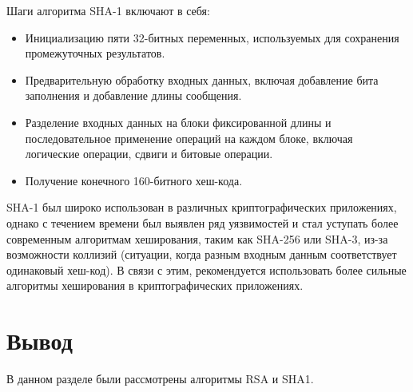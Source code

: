 Шаги алгоритма SHA-1 включают в себя:
\begin{itemize}
	\item Инициализацию пяти 32-битных переменных, используемых для сохранения промежуточных результатов.
	\item Предварительную обработку входных данных, включая добавление бита заполнения и добавление длины сообщения.
	\item Разделение входных данных на блоки фиксированной длины и последовательное применение операций на каждом блоке, включая логические операции, сдвиги и битовые операции.
	\item Получение конечного 160-битного хеш-кода.
\end{itemize}

SHA-1 был широко использован в различных криптографических приложениях, однако с течением времени был выявлен ряд уязвимостей и стал уступать более современным алгоритмам хеширования, таким как SHA-256 или SHA-3, из-за возможности коллизий (ситуации, когда разным входным данным соответствует одинаковый хеш-код). В связи с этим, рекомендуется использовать более сильные алгоритмы хеширования в криптографических приложениях.

\section*{Вывод}
В данном разделе были рассмотрены алгоритмы RSA и SHA1.